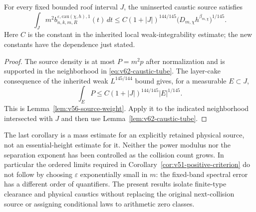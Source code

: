 \begin{corollary}
\label{cor:v62-caustic-mass}
For every fixed bounded roof interval $J$, the uninserted caustic
source satisfies
\begin{equation}\label{eq:v62-caustic-mass}
 \int_Jm^2b^{\varepsilon,\mathrm{cau}(\chi,h),1}_{n,k,m,R}(t)\,dt
 \le C(1+|J|)^{144/145}
       \bigl(D_{m,\chi}h^{\beta_{m,\chi}}\bigr)^{1/145}.
\end{equation}
Here $C$ is the constant in the inherited local weak-integrability
estimate; the new constants have the dependence just stated.
\end{corollary}
\begin{proof}
The source density is at most $P=m^2p$ after normalization and is
supported in the neighborhood in \eqref{eq:v62-caustic-tube}.
The layer-cake consequence of the inherited weak
$L^{145/144}$ bound gives, for a measurable $E\subset J$,
\[
 \int_E P\le C(1+|J|)^{144/145}|E|^{1/145}.
\]
This is Lemma~\ref{lem:v56-source-weight}. Apply it to the indicated
neighborhood intersected with $J$ and then use
Lemma~\ref{lem:v62-caustic-tube}.
\end{proof}

The last corollary is a mass estimate for an explicitly retained
physical source, not an essential-height estimate for it. Neither the
power modulus nor the separation exponent has been controlled as the
collision count grows. In particular the ordered limits required in
Corollary~\ref{cor:v51-positive-criterion} do not follow by choosing
$\varepsilon$ exponentially small in $m$: the fixed-band spectral
error has a different order of quantifiers. The present results isolate
finite-type clearance and physical caustics without replacing the
original next-collision source or assigning conditional laws to
arithmetic zero classes.
